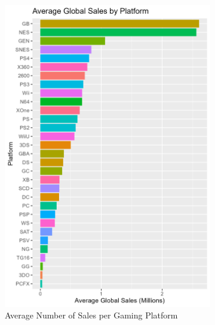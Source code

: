 \documentclass[12pt,english]{article}
\begin{document}
\begin{figure}[ht]
\centering
\begin{subfigure}{0.49\linewidth}
    \centering
    \includegraphics[width=\linewidth]{Figures/avg_sales_platform.png}
    \caption{Average Number of Sales per Gaming Platform}
    \label{fig:fig3}
\end{subfigure}
\begin{subfigure}{0.49\linewidth}
    \centering

\end{subfigure}
\end{figure}
\end{document}
